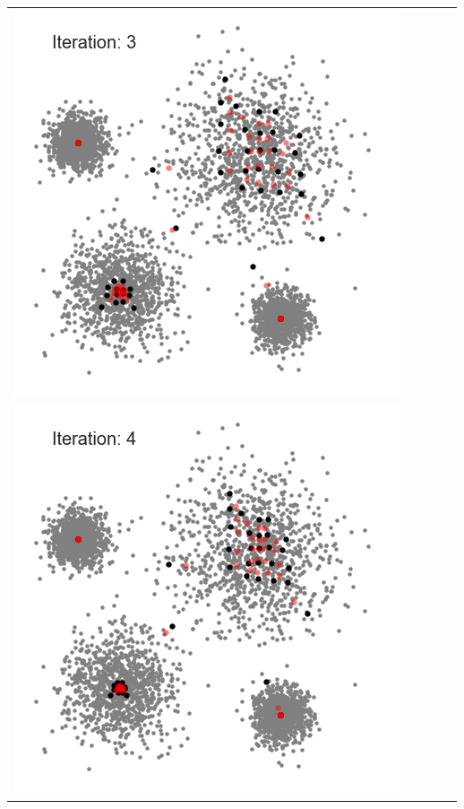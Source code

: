 \documentclass{beamer}
\begin{document}
\begin{frame}
{\begin{tabular}{ccccc}
	\includegraphics[scale=0.15]{meanshift/meanshift-10}\\
	\includegraphics[scale=0.15]{meanshift/meanshift-12}&

\end{tabular}}
\end{frame}
\end{document}

